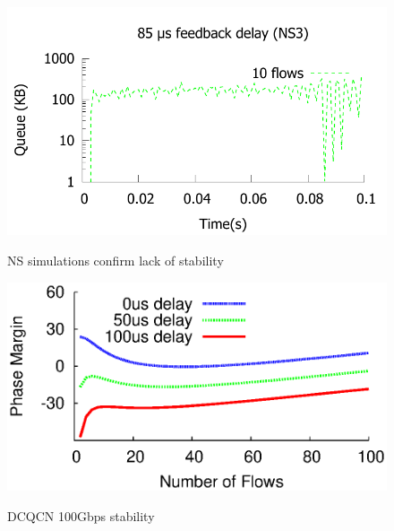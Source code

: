 \begin{figure}[t]
{\begin{minipage}{0.31\textwidth}
\includegraphics[width=0.99\columnwidth]{figures/stable_queue_85_ns.pdf}
\vspace{-2em}
\caption{NS simulations confirm lack of stability}
\label{fig:dcqcn_unstable_ns}

\includegraphics[width=0.95\columnwidth]{figures/dcqcn_stability_100gbps.eps}
\vspace{-1em}
\caption{DCQCN 100Gbps stability}
\vspace{-0.5em}
\label{fig:dcqcn_100gbps}
\end{minipage}
}
\end{figure}


